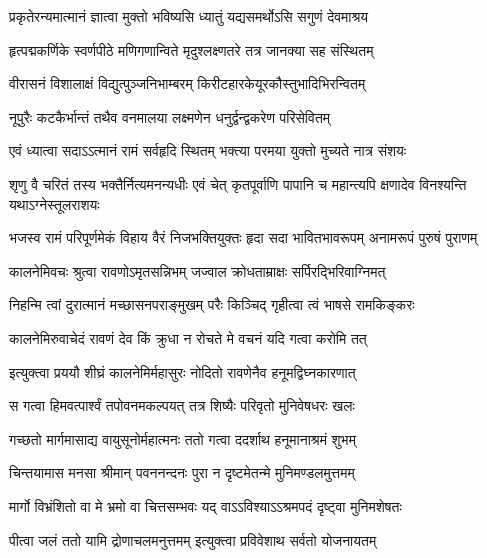 \twolineshloka
{प्रकृतेरन्यमात्मानं ज्ञात्वा मुक्तो भविष्यसि}
{ध्यातुं यद्यसमर्थोऽसि सगुणं देवमाश्रय} %

\twolineshloka
{हृत्पद्मकर्णिके स्वर्णपीठे मणिगणान्विते}
{मृदुश्लक्ष्णतरे तत्र जानक्या सह संस्थितम्} %

\twolineshloka
{वीरासनं विशालाक्षं विद्युत्पुञ्जनिभाम्बरम्}
{किरीटहारकेयूरकौस्तुभादिभिरन्वितम्} %

\twolineshloka
{नूपुरैः कटकैर्भान्तं तथैव वनमालया}
{लक्ष्मणेन धनुर्द्वन्द्वकरेण परिसेवितम्} %

\twolineshloka
{एवं ध्यात्वा सदाऽऽत्मानं रामं सर्वहृदि स्थितम्}
{भक्त्या परमया युक्तो मुच्यते नात्र संशयः} %

\threelineshloka
{शृणु वै चरितं तस्य भक्तैर्नित्यमनन्यधीः}
{एवं चेत् कृतपूर्वाणि पापानि च महान्त्यपि}
{क्षणादेव विनश्यन्ति यथाऽग्नेस्तूलराशयः} %

\fourlineindentedshloka
{भजस्व रामं परिपूर्णमेकं}
{विहाय वैरं निजभक्तियुक्तः}
{हृदा सदा भावितभावरूपम्}
{अनामरूपं पुरुषं पुराणम्} %






\twolineshloka
{कालनेमिवचः श्रुत्वा रावणोऽमृतसन्निभम्}
{जज्वाल क्रोधताम्राक्षः सर्पिरद्भिरिवाग्निमत्} %

\twolineshloka
{निहन्मि त्वां दुरात्मानं मच्छासनपराङ्मुखम्}
{परैः किञ्चिद् गृहीत्वा त्वं भाषसे रामकिङ्करः} %

\twolineshloka
{कालनेमिरुवाचेदं रावणं देव किं क्रुधा}
{न रोचते मे वचनं यदि गत्वा करोमि तत्} %

\twolineshloka
{इत्युक्त्वा प्रययौ शीघ्रं कालनेमिर्महासुरः}
{नोदितो रावणेनैव हनूमद्विघ्नकारणात्} %

\twolineshloka
{स गत्वा हिमवत्पार्श्वं तपोवनमकल्पयत्}
{तत्र शिष्यैः परिवृतो मुनिवेषधरः खलः} %

\twolineshloka
{गच्छतो मार्गमासाद्य वायुसूनोर्महात्मनः}
{ततो गत्वा ददर्शाथ हनूमानाश्रमं शुभम्} %

\twolineshloka
{चिन्तयामास मनसा श्रीमान् पवननन्दनः}
{पुरा न दृष्टमेतन्मे मुनिमण्डलमुत्तमम्} %

\twolineshloka
{मार्गो विभ्रंशितो वा मे भ्रमो वा चित्तसम्भवः}
{यद् वाऽऽविश्याऽऽश्रमपदं दृष्ट्वा मुनिमशेषतः} %

\twolineshloka
{पीत्वा जलं ततो यामि द्रोणाचलमनुत्तमम्}
{इत्युक्त्वा प्रविवेशाथ सर्वतो योजनायतम्} %

